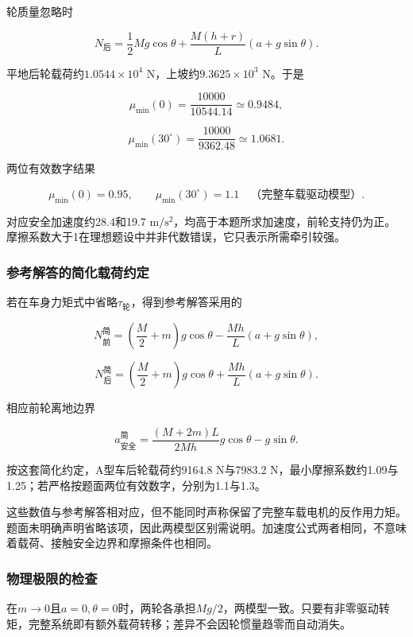 \documentclass[12pt,a4paper,fontset=fandol]{ctexart}
\begin{document}
轮质量忽略时

\[
N_{\text{后}}=\frac12Mg\cos\theta
+\frac{M(h+r)}L(a+g\sin\theta).
\]

平地后轮载荷约\(1.0544\times10^4\) N，上坡约\(9.3625\times10^3\) N。于是

\[
\mu_{\min}(0)=\frac{10000}{10544.14}\simeq0.9484,
\]

\[
\mu_{\min}(30^\circ)=\frac{10000}{9362.48}\simeq1.0681.
\]

两位有效数字结果

\[
\boxed{
\mu_{\min}(0)=0.95,\qquad
\mu_{\min}(30^\circ)=1.1}
\quad\text{（完整车载驱动模型）}.
\]

对应安全加速度约28.4和19.7
\(\mathrm{m/s^2}\)，均高于本题所求加速度，前轮支持仍为正。摩擦系数大于1在理想题设中并非代数错误，它只表示所需牵引较强。

\subsubsection{参考解答的简化载荷约定}\label{ux53c2ux8003ux89e3ux7b54ux7684ux7b80ux5316ux8f7dux8377ux7ea6ux5b9a}

若在车身力矩式中省略\(\tau_{\text{轮}}\)，得到参考解答采用的

\[
\boxed{
N_{\text{前}}^{\text{简}}
=\left(\frac M2+m\right)g\cos\theta
-\frac{Mh}L(a+g\sin\theta)},
\]

\[
\boxed{
N_{\text{后}}^{\text{简}}
=\left(\frac M2+m\right)g\cos\theta
+\frac{Mh}L(a+g\sin\theta)}.
\]

相应前轮离地边界

\[
a_{\text{安全}}^{\text{简}}
=\frac{(M+2m)L}{2Mh}g\cos\theta-g\sin\theta.
\]

按这套简化约定，A型车后轮载荷约9164.8 N与7983.2
N，最小摩擦系数约1.09与1.25；若严格按题面两位有效数字，分别为1.1与1.3。

这些数值与参考解答相对应，但不能同时声称保留了完整车载电机的反作用力矩。题面未明确声明省略该项，因此两模型区别需说明。加速度公式两者相同，不意味着载荷、接触安全边界和摩擦条件也相同。

\subsubsection{物理极限的检查}\label{ux7269ux7406ux6781ux9650ux7684ux68c0ux67e5}

在\(m\to0\)且\(a=0,\theta=0\)时，两轮各承担\(Mg/2\)，两模型一致。只要有非零驱动转矩，完整系统即有额外载荷转移；差异不会因轮惯量趋零而自动消失。
\end{document}
